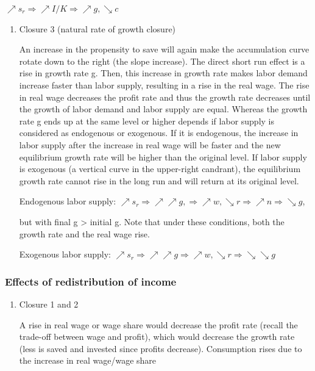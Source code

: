 \documentclass[
  letterpaper,
  DIV=11,
  numbers=noendperiod]{scrreprt}
\begin{document}
\(\nearrow s_r \Rightarrow \nearrow I/K \Rightarrow \nearrow g, \searrow c\)

\begin{enumerate}
\def\labelenumi{\arabic{enumi}.}
\setcounter{enumi}{1}
\item
  Closure 3 (natural rate of growth closure)

  An increase in the propensity to save will again make the accumulation
  curve rotate down to the right (the slope increase). The direct short
  run effect is a rise in growth rate g. Then, this increase in growth
  rate makes labor demand increase faster than labor supply, resulting
  in a rise in the real wage. The rise in real wage decreases the profit
  rate and thus the growth rate decreases until the growth of labor
  demand and labor supply are equal. Whereas the growth rate g ends up
  at the same level or higher depends if labor supply is considered as
  endogenous or exogenous. If it is endogenous, the increase in labor
  supply after the increase in real wage will be faster and the new
  equilibrium growth rate will be higher than the original level. If
  labor supply is exogenous (a vertical curve in the upper-right
  candrant), the equilibrium growth rate cannot rise in the long run and
  will return at its original level.

  Endogenous labor supply:
  \(\nearrow s_r \Rightarrow \nearrow \nearrow g, \Rightarrow \nearrow w, \searrow r \Rightarrow \nearrow n \Rightarrow \searrow g\),

  but with final g \textgreater{} initial g. Note that under these
  conditions, both the growth rate and the real wage rise.

  Exogenous labor supply:
  \(\nearrow s_r \Rightarrow \nearrow \nearrow g \Rightarrow \nearrow w, \searrow r \Rightarrow \searrow \searrow g\)
\end{enumerate}

\hypertarget{effects-of-redistribution-of-income}{%
\subsubsection{Effects of redistribution of
income}\label{effects-of-redistribution-of-income}}

\begin{enumerate}
\def\labelenumi{\arabic{enumi}.}
\item
  Closure 1 and 2

  A rise in real wage or wage share would decrease the profit rate
  (recall the trade-off between wage and profit), which would decrease
  the growth rate (less is saved and invested since profits decrease).
  Consumption rises due to the increase in real wage/wage share
\end{enumerate}
\end{document}
